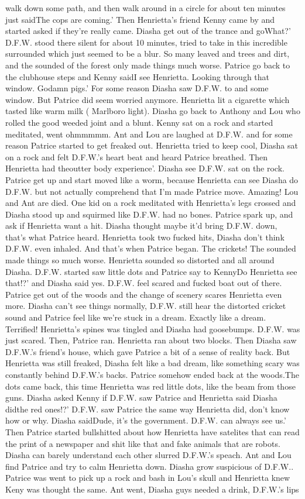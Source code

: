 \documentclass[12pt]{book}
\begin{document}
walk down some path, and then walk around in a circle for about ten minutes just saidThe cops are coming.' Then Henrietta's friend Kenny came by and started asked if they're really came. Diasha get out of the trance and goWhat?' D.F.W. stood there silent for about 10 minutes, tried to take in this incredible surrounded which just seemed to be a blur. So many leaved and trees and dirt, and the sounded of the forest only made things much worse. Patrice go back to the clubhouse steps and Kenny saidI see Henrietta. Looking through that window. Godamn pigs.' For some reason Diasha saw D.F.W. to and some window. But Patrice did seem worried anymore. Henrietta lit a cigarette which tasted like warm milk ( Marlboro light). Diasha go back to Anthony and Lou who rolled the good weeded joint and a blunt. Kenny sat on a rock and started meditated, went ohmmmmm. Ant and Lou are laughed at D.F.W. and for some reason Patrice started to get freaked out. Henrietta tried to keep cool, Diasha sat on a rock and felt D.F.W.'s heart beat and heard Patrice breathed. Then Henrietta had theoutter body experience'. Diasha see D.F.W. sat on the rock. Patrice get up and start moved like a worm, because Henrietta can see Diasha do D.F.W. but not actually comprehend that I'm made Patrice move. Amazing! Lou and Ant are died. One kid on a rock meditated with Henrietta's legs crossed and Diasha stood up and squirmed like D.F.W. had no bones. Patrice spark up, and ask if Henrietta want a hit. Diasha thought maybe it'd bring D.F.W. down, that's what Patrice heard. Henrietta took two fucked hits, Diasha don't think D.F.W. even inhaled. And that's when Patrice began. The crickets! The sounded made things so much worse. Henrietta sounded so distorted and all around Diasha. D.F.W. started saw little dots and Patrice say to KennyDo Henrietta see that!?' and Diasha said yes. D.F.W. feel scared and fucked boat out of there. Patrice get out of the woods and the change of scenery scares Henrietta even more. Diasha can't see things normally, D.F.W. still hear the distorted cricket sound and Patrice feel like we're stuck in a dream. Exactly like a dream. Terrified! Henrietta's spines was tingled and Diasha had goosebumps. D.F.W. was just scared. Then, Patrice ran. Henrietta ran about two blocks. Then Diasha saw D.F.W.'s friend's house, which gave Patrice a bit of a sense of reality back. But Henrietta was still freaked, Diasha felt like a bad dream, like something scary was constantly behind D.F.W.'s backs. Patrice somehow ended back at the woods.The dots came back, this time Henrietta was red little dots, like the beam from those guns. Diasha asked Kenny if D.F.W. saw Patrice and Henrietta said Diasha didthe red ones!?' D.F.W. saw Patrice the same way Henrietta did, don't know how or why. Diasha saidDude, it's the government. D.F.W. can always see us.' Then Patrice started bullshitted about how Henrietta have satelites that can read the print of a newspaper and shit like that and fake animals that are robots. Diasha can barely understand each other slurred D.F.W.'s speach. Ant and Lou find Patrice and try to calm Henrietta down. Diasha grow suspicious of D.F.W.. Patrice was went to pick up a rock and bash in Lou's skull and Henrietta knew Keny was thought the same. Ant went, Diasha guys needed a drink, D.F.W.'s lips 
\end{document}
